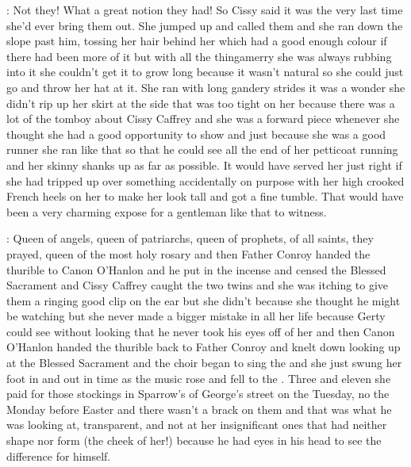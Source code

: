 :
Not they!
What a great notion
they had!
So Cissy said
it was the very last time
she'd ever bring them out.
She jumped up and called them
and she ran down the slope past him,
tossing her hair behind her
which had a good enough colour
if there had been more of it
but with all the thingamerry
she was always rubbing into it
she couldn't get it to grow long
because it wasn't natural
so she could just go
and throw her hat at it.
She ran with long gandery strides
it was a wonder
she didn't rip up her skirt at the side
that was too tight on her
because there was a lot of the tomboy
about Cissy Caffrey
and she was a forward piece
whenever she thought
she had a good opportunity to show
and just because she was a good runner
she ran like that
so that he could see
all the end of her petticoat
running and her skinny shanks
up as far as possible.
It would have served her just right
if she had tripped up
over something accidentally on purpose
with her high crooked French heels on her
to make her look tall
and got a fine tumble.
That would have been
a very charming expose
for a gentleman like that
to witness.

:
Queen of angels,
queen of patriarchs,
queen of prophets,
of all saints,
they prayed,
queen of the most holy rosary
and then Father Conroy
handed the thurible
to Canon O'Hanlon
and he put in the incense
and censed the Blessed Sacrament
and Cissy Caffrey caught the two twins
and she was itching
to give them a ringing good clip on the ear
but she didn't
because she thought
he might be watching
but she never made a bigger mistake in all her life
because Gerty could see without looking
that he never took his eyes off of her
and then Canon O'Hanlon
handed the thurible
back to Father Conroy
and knelt down
looking up at the Blessed Sacrament
and the choir
began to sing the 
and she just swung her foot
in and out in time
as the music rose and fell
to the .
Three and eleven
she paid for those stockings
in Sparrow's of George's street
on the Tuesday,
no the Monday before Easter
and there wasn't a brack on them
and that was what he was looking at,
transparent,
and not at her insignificant ones
that had neither shape nor form
(the cheek of her!)
because he had eyes in his head
to see the difference
for himself.

